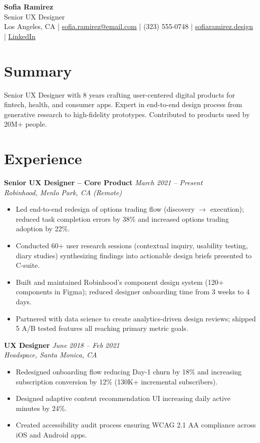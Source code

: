 \documentclass[11pt,a4paper]{article}
\begin{document}
\begin{center}
  {\LARGE \textbf{Sofia Ramirez}}\\[3pt]
  {\large \textcolor{accent}{Senior UX Designer}}\\[4pt]
  Los Angeles, CA \quad|\quad
  \href{mailto:sofia.ramirez@email.com}{sofia.ramirez@email.com} \quad|\quad
  (323) 555-0748 \quad|\quad
  \href{https://sofiaramirez.design}{sofiaramirez.design} \quad|\quad
  \href{https://linkedin.com/in/sofiaramirez}{LinkedIn}
\end{center}

\section{Summary}
Senior UX Designer with 8 years crafting user-centered digital products for fintech, health, and consumer apps. Expert in end-to-end design process from generative research to high-fidelity prototypes. Contributed to products used by 20M+ people.

\section{Experience}

\noindent\textbf{Senior UX Designer -- Core Product} \hfill \textit{March 2021 -- Present}\\
\textit{Robinhood, Menlo Park, CA (Remote)}
\begin{itemize}
  \item Led end-to-end redesign of options trading flow (discovery $\rightarrow$ execution); reduced task completion errors by 38\% and increased options trading adoption by 22\%.
  \item Conducted 60+ user research sessions (contextual inquiry, usability testing, diary studies) synthesizing findings into actionable design briefs presented to C-suite.
  \item Built and maintained Robinhood's component design system (120+ components in Figma); reduced designer onboarding time from 3 weeks to 4 days.
  \item Partnered with data science to create analytics-driven design reviews; shipped 5 A/B tested features all reaching primary metric goals.
\end{itemize}

\vspace{4pt}
\noindent\textbf{UX Designer} \hfill \textit{June 2018 -- Feb 2021}\\
\textit{Headspace, Santa Monica, CA}
\begin{itemize}
  \item Redesigned onboarding flow reducing Day-1 churn by 18\% and increasing subscription conversion by 12\% (130K+ incremental subscribers).
  \item Designed adaptive content recommendation UI increasing daily active minutes by 24\%.
  \item Created accessibility audit process ensuring WCAG 2.1 AA compliance across iOS and Android apps.
\end{itemize}
\end{document}
